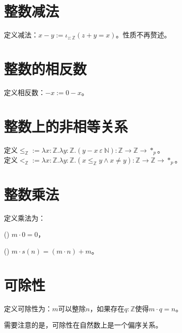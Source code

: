 \documentclass[UTF8]{article}
\newcommand{\rmnum}[1]{\romannumeral #1}
\begin{document}
	\section{整数减法}
	\noindent
	定义减法：$x-y:=\iota_{z:\mathbb{Z}}(z+y=x)$。性质不再赘述。
	
	\section{整数的相反数}
	\noindent
	定义相反数：$-x:=0-x$。
	
	\section{整数上的非相等关系}
	\noindent
	定义$\le_{\mathbb{Z}}:=\lambda x:\mathbb{Z}.\lambda y:\mathbb{Z}.(y-x\ \varepsilon\ \mathbb{N}):\mathbb{Z}\rightarrow\mathbb{Z}\rightarrow*_p$。\\定义$<_{\mathbb{Z}}:=\lambda x:\mathbb{Z}.\lambda y:\mathbb{Z}.(x\le_{\mathbb{Z}}y\land x\not=y):\mathbb{Z}\rightarrow\mathbb{Z}\rightarrow*_p$。
	
	\section{整数乘法}
	\noindent
	定义乘法为：
	
		(\rmnum{1}) $m·0=0$，
		
		(\rmnum{2}) $m·s(n)=(m·n)+m$。
		
	\section{可除性}
	\noindent
	定义可除性为：$m$可以整除$n$，如果存在$q:\mathbb{Z}$使得$m·q=n$。
	
		需要注意的是，可除性在自然数上是一个偏序关系。
\end{document}
